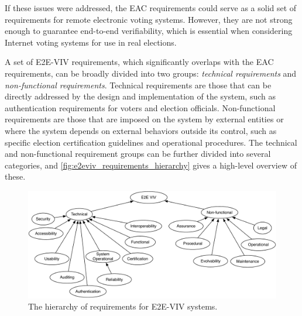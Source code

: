 
If these issues were addressed, the EAC requirements could serve as a
solid set of requirements for remote electronic voting
systems. However, they are not strong enough to guarantee end-to-end
verifiability, which is essential when considering Internet voting
systems for use in real elections.  

A set of E2E-VIV requirements, which significantly overlaps with the
EAC requirements, can be broadly divided into two groups:
\emph{technical requirements} and \emph{non-functional
  requirements}. Technical requirements are those that can be directly
addressed by the design and implementation of the system, such as
authentication requirements for voters and election
officials. Non-functional requirements are those that are imposed on
the system by external entities or where the system depends on
external behaviors outside its control, such as specific election
certification guidelines and operational procedures. The technical and
non-functional requirement groups can be further divided into several
categories, and \autoref{fig:e2eviv_requirements_hierarchy} gives a
high-level overview of these.

\begin{figure}
\begin{center}
\includegraphics[width=6in]{required_properties_resources/hierarchy}
\end{center}
\caption{The hierarchy of requirements for E2E-VIV systems.}
\label{fig:e2eviv_requirements_hierarchy}
\end{figure}

